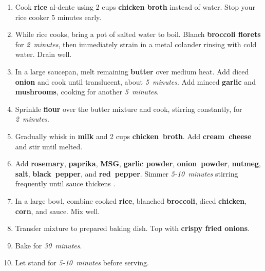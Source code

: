 \documentclass[11pt,letterpaper]{article}
\begin{document}
\begin{enumerate}
    \item Cook \textbf{rice} al-dente using 2 cups \textbf{chicken broth} instead of water. Stop your rice cooker 5 minutes early.
    
    \item While rice cooks, bring a pot of salted water to boil. Blanch \textbf{broccoli florets} for \textit{2~minutes}, then immediately strain in a metal colander rinsing with cold water. Drain well.
    
    \item In a large saucepan, melt remaining \textbf{butter} over medium heat. Add diced \textbf{onion} and cook until translucent, about \textit{5~minutes}. Add minced \textbf{garlic} and \textbf{mushrooms}, cooking for another \textit{5~minutes}.
    
    \item Sprinkle \textbf{flour} over the butter mixture and cook, stirring constantly, for \textit{2~minutes}.
    
    \item Gradually whisk in \textbf{milk} and 2 cups \textbf{chicken~broth}. Add \textbf{cream~cheese} and stir until melted.
    
    \item Add \textbf{rosemary}, \textbf{paprika}, \textbf{MSG}, \textbf{garlic powder}, \textbf{onion~powder}, \textbf{nutmeg}, \textbf{salt},  \textbf{black~pepper}, and \textbf{red~pepper}. Simmer \textit{5-10~minutes} stirring frequently until sauce thickens .
    
    \item In a large bowl, combine cooked \textbf{rice}, blanched \textbf{broccoli}, diced \textbf{chicken}, \textbf{corn}, and sauce. Mix well.
    
    \item Transfer mixture to prepared baking dish. Top with \textbf{crispy fried onions}.
    
    \item Bake for \textit{30~minutes}.
    
    \item Let stand for \textit{5-10~minutes} before serving.
\end{enumerate}

\newpage
\end{document}

